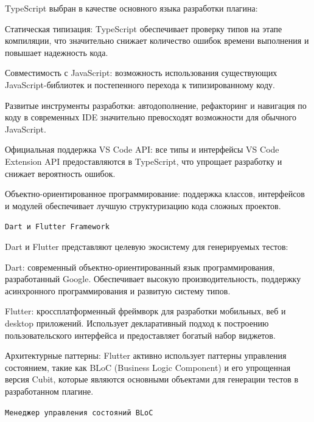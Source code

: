 \documentclass[14pt, russian]{scrartcl}
\begin{document}
TypeScript выбран в качестве основного языка разработки плагина:
\begin{itemize*}
    \item Статическая типизация: TypeScript обеспечивает проверку типов на этапе компиляции, что значительно снижает количество ошибок времени выполнения и повышает надежность кода.
    \item Совместимость с JavaScript: возможность использования существующих JavaScript-библиотек и постепенного перехода к типизированному коду.
    \item Развитые инструменты разработки: автодополнение, рефакторинг и навигация по коду в современных IDE значительно превосходят возможности для обычного JavaScript.
    \item Официальная поддержка VS Code API: все типы и интерфейсы VS Code Extension API предоставляются в TypeScript, что упрощает разработку и снижает вероятность ошибок.
    \item Объектно-ориентированное программирование: поддержка классов, интерфейсов и модулей обеспечивает лучшую структуризацию кода сложных проектов.
\end{itemize*}

\texttt{Dart и Flutter Framework}

Dart и Flutter представляют целевую экосистему для генерируемых тестов:
\begin{itemize*}
    \item Dart: современный объектно-ориентированный язык программирования, разработанный Google. Обеспечивает высокую производительность, поддержку асинхронного программирования и развитую систему типов.
    \item Flutter: кроссплатформенный фреймворк для разработки мобильных, веб и desktop приложений. Использует декларативный подход к построению пользовательского интерфейса и предоставляет богатый набор виджетов.
    \item Архитектурные паттерны: Flutter активно использует паттерны управления состоянием, такие как BLoC (Business Logic Component) и его упрощенная версия Cubit, которые являются основными объектами для генерации тестов в разработанном плагине.
\end{itemize*}

\texttt{Менеджер управления состояний BLoC}
\end{document}
